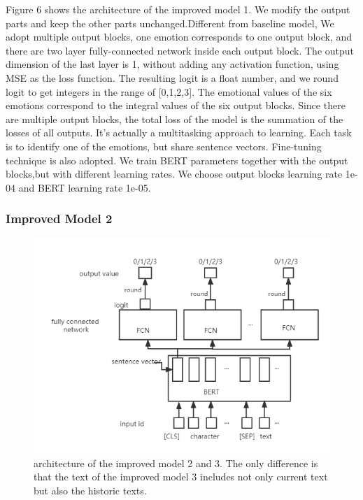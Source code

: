 \documentclass[12pt,twocolumn,letterpaper]{article}
\begin{document}
Figure 6 shows the architecture of the improved model 1. We modify the output parts and keep the other parts unchanged.Different from baseline model, We adopt multiple output blocks, one emotion corresponds to one output block, and there are two layer fully-connected network inside each output block. The output dimension of the last layer is 1, without adding any activation function, using MSE as the loss function.  The resulting logit is a float number, and we round logit to get integers in the range of [0,1,2,3]. The emotional values of the six emotions correspond to the integral values of the six output blocks. Since there are multiple output blocks, the total loss of the model is the summation of the losses of all outputs.  It's actually a multitasking approach to learning. Each task is to identify one of the emotions, but share sentence vectors. Fine-tuning technique is also adopted. We train BERT parameters together with the output blocks,but with different learning rates. We choose output blocks learning rate 1e-04 and BERT learning rate 1e-05.
\subsubsection{Improved Model 2}
\begin{figure}
\begin{center}
\includegraphics[scale=0.5]{Method3.png}
\end{center}
   \caption{architecture of the improved model 2 and 3. The only difference is that the text of the improved model 3 includes not only current text but also the historic texts. }
\label{fig:short}
\end{figure}
\end{document}

